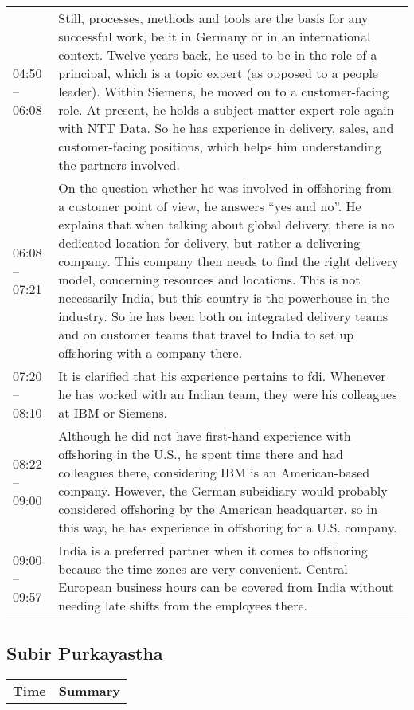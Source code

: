 \begin{appendix}
\begin{longtable}{l p{12.5cm}}
	04:50 -- 06:08&Still, processes, methods and tools are the basis for any successful work, be it in Germany or in an international context. Twelve years back, he used to be in the role of a principal, which is a topic expert (as opposed to a people leader). Within Siemens, he moved on to a customer-facing role. At present, he holds a subject matter expert role again with NTT Data. So he has experience in delivery, sales, and customer-facing positions, which helps him understanding the partners involved.\\
	06:08 -- 07:21&On the question whether he was involved in offshoring from a customer point of view, he answers ``yes and no''. He explains that when talking about global delivery, there is no dedicated location for delivery, but rather a delivering company. This company then needs to find the right delivery model, concerning resources and locations. This is not necessarily India, but this country is the powerhouse in the industry. So he has been both on integrated delivery teams and on customer teams that travel to India to set up offshoring with a company there.\\
	07:20 -- 08:10 & It is clarified that his experience pertains to \gls{fdi}. Whenever he has worked with an Indian team, they were his colleagues at IBM or Siemens.\\
	08:22 -- 09:00&Although he did not have first-hand experience with offshoring in the U.S., he spent time there and had colleagues there, considering IBM is an American-based company. However, the German subsidiary would probably considered offshoring by the American headquarter, so in this way, he has experience in offshoring for a U.S. company.\\
	09:00 -- 09:57& India is a preferred partner when it comes to offshoring because the time zones are very convenient. Central European business hours can be covered from India without needing late shifts from the employees there.\\
	
\end{longtable}

\tocless\subsection{Subir Purkayastha}

\begin{longtable}{l p{12.5cm}}
	\textbf{Time} & \textbf{Summary} \\ 
	
\end{longtable}	

\end{appendix}	